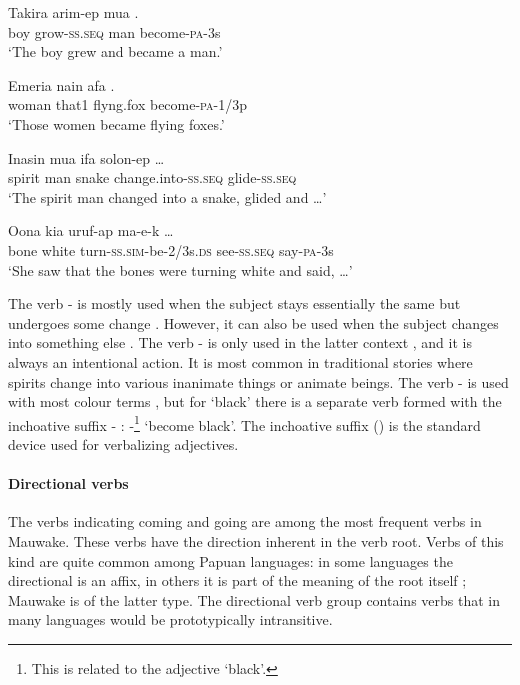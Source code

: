 \ea%
\label{ex:3:x276}
\gll Takira arim-ep mua . \\
boy grow-\textsc{ss}.\textsc{seq} man become-\textsc{pa}-3s \\
\glt`The boy grew and became a man.'
\z

\ea%
\label{ex:3:x277}
\gll Emeria nain afa . \\
woman that1 flyng.fox become-\textsc{pa}-1/3p \\
\glt`Those women became flying foxes.'
\z

\ea%
\label{ex:3:x278}
\gll Inasin mua ifa  solon-ep {\dots} \\
spirit man snake change.into-\textsc{ss}.\textsc{seq} glide-\textsc{ss}.\textsc{seq} \\
\glt`The spirit man changed into a snake, glided and {\dots}'
\z

\ea%
\label{ex:3:x279}
\gll Oona kia  uruf-ap ma-e-k {\dots} \\
bone white turn-\textsc{ss}.\textsc{sim}-be-2/3s.\textsc{ds} see-\textsc{ss}.\textsc{seq} say-\textsc{pa}-3s \\
\glt`She saw that the bones were turning white and said, {\dots}'
\z

The verb - is mostly used when the subject stays essentially the same but undergoes some change . However, it can also be used when the subject changes into something else . The verb - is only used in the latter context , and it is always an intentional action. It is most common in traditional stories where spirits change into various inanimate things or animate beings. The verb - is used with most colour terms , but for `black' there is a separate verb formed with the inchoative suffix \nobreakdash- : -\footnote{This is related to the adjective  `black'.} `become black'. The inchoative suffix () is the standard device used for verbalizing adjectives. 

\paragraph{Directional verbs}\label{sec:3:a:z:y:x}
{}
The verbs indicating coming and going are among the most frequent verbs in Mauwake. These verbs have the direction inherent in the verb root. Verbs of this kind are quite common among Papuan languages: in some languages the directional is an affix, in others it is part of the meaning of the root itself \citep[149]{Foley1986}; Mauwake is of the latter type. The directional verb group contains verbs that in many languages would be prototypically intransitive.

